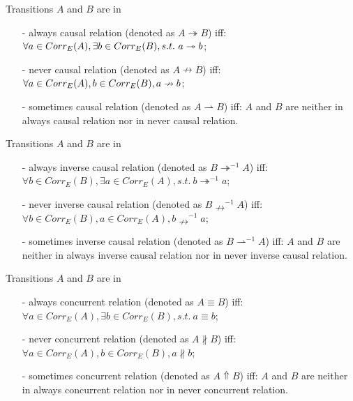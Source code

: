 \documentclass{llncs}
\begin{document}
\begin{definition}\label{def:causalRelations}
Transitions $A$ and $B$ are in
	\begin{itemize}
		\item[-] always causal relation (denoted as $A\twoheadrightarrow B$) iff: $\forall a\in Corr_{E}(A), \exists b\in Corr_{E}(B),\\s.t.~a\twoheadrightarrow b$;
		\item[-] never causal relation (denoted as $A\nrightarrow B$) iff: $\forall a\in Corr_{E}(A), b\in Corr_{E}(B),\\a\nrightarrow b$;
		\item[-] sometimes causal relation (denoted as $A\rightharpoonup B$) iff: $A$ and $B$ are neither in always causal relation nor in never causal relation.
	\end{itemize}
\end{definition}

\begin{definition}\label{def:inverseCausalRelations}
Transitions $A$ and $B$ are in
	\begin{itemize}
		\item[-] always inverse causal relation (denoted as $B\twoheadrightarrow^{-1}A$) iff: $\forall b\in Corr_{E}(B), \exists a\in Corr_{E}(A), s.t.~b\twoheadrightarrow^{-1}a$;
		\item[-] never inverse causal relation (denoted as $B\nrightarrow^{-1}A$) iff: $\forall b\in Corr_{E}(B), a\in Corr_{E}(A), b\nrightarrow^{-1}a$;
		\item[-] sometimes inverse causal relation (denoted as $B\rightharpoonup^{-1}A$) iff: $A$ and $B$ are neither in always inverse causal relation nor in never inverse causal relation.
	\end{itemize}
\end{definition}

\begin{definition}\label{def:concurrentRelations}
Transitions $A$ and $B$ are in
	\begin{itemize}
		\item[-] always concurrent relation (denoted as $A\equiv B$) iff: $\forall a\in Corr_{E}(A),\exists b\in Corr_{E}(B),s.t.~a\equiv b$;
		\item[-] never concurrent relation (denoted as $A\nparallel B$) iff: $\forall a\in Corr_{E}(A),b\in Corr_{E}(B),a\nparallel b$;
		\item[-] sometimes concurrent relation (denoted as $A\Uparrow B$) iff: $A$ and $B$ are neither in always concurrent relation nor in never concurrent relation.
	\end{itemize}
\end{definition}
\end{document}
